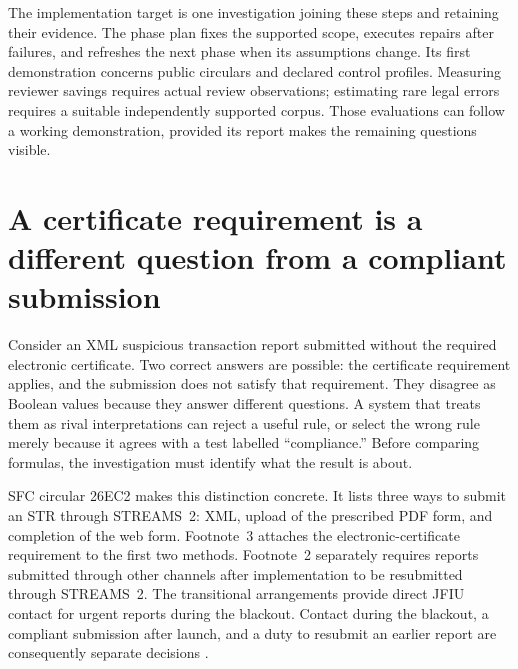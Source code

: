 \documentclass[12pt,a4paper,oneside,openany]{book}
\begin{document}
The implementation target is one investigation joining these steps and retaining
their evidence. The phase plan fixes the supported scope, executes repairs after
failures, and refreshes the next phase when its assumptions change. Its first
demonstration concerns public circulars and declared control profiles. Measuring
reviewer savings requires actual review observations; estimating rare legal
errors requires a suitable independently supported corpus. Those evaluations
can follow a working demonstration, provided its report makes the remaining
questions visible.

\section{A certificate requirement is a different question from a compliant submission}
\label{sec:typed-decision-assurance}

Consider an XML suspicious transaction report submitted without the required
electronic certificate. Two correct answers are possible: the certificate
requirement applies, and the submission does not satisfy that requirement.
They disagree as Boolean values because they answer different questions. A
system that treats them as rival interpretations can reject a useful rule,
or select the wrong rule merely because it agrees with a test labelled
``compliance.'' Before comparing formulas, the investigation must identify what
the result is about.

SFC circular 26EC2 makes this distinction concrete. It lists three ways to
submit an STR through STREAMS~2: XML, upload of the prescribed PDF form, and
completion of the web form. Footnote~3 attaches the electronic-certificate
requirement to the first two methods. Footnote~2 separately requires reports
submitted through other channels after implementation to be resubmitted through
STREAMS~2. The transitional arrangements provide direct JFIU contact for urgent
reports during the blackout. Contact during the blackout, a compliant submission
after launch, and a duty to resubmit an earlier report are consequently separate
decisions \citep{sfcstr2026}.
\end{document}
